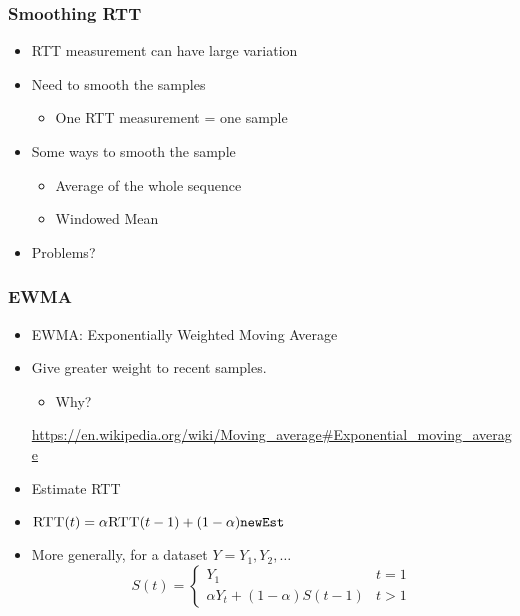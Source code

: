 \subsubsection{Smoothing RTT}
\begin{itemize}[nosep]
    \item RTT measurement can have large variation
    \item Need to smooth the samples
          \begin{itemize}[nosep]
              \item One RTT measurement = one sample
          \end{itemize}
    \item Some ways to smooth the sample
          \begin{itemize}[nosep]
              \item Average of the whole sequence
              \item Windowed Mean
          \end{itemize}
    \item Problems?
\end{itemize}

\subsubsection{EWMA}
\begin{itemize}[nosep]
    \item EWMA: Exponentially Weighted Moving Average
    \item Give greater weight to recent samples.
          \begin{itemize}[nosep]
              \item Why?
          \end{itemize}
          \url{https://en.wikipedia.org/wiki/Moving_average#Exponential_moving_average}
    \item Estimate RTT
    \item $\textproc{RTT}(t) = \alpha \textproc{RTT}(t - 1) + (1 - \alpha) \texttt{newEst}$
    \item More generally, for a dataset $Y = Y_1, Y_2, \dots$
          \[S(t) = \begin{cases}Y_1 & t = 1\\\alpha Y_t + (1 - \alpha)S(t - 1) & t > 1\end{cases}\]
\end{itemize}